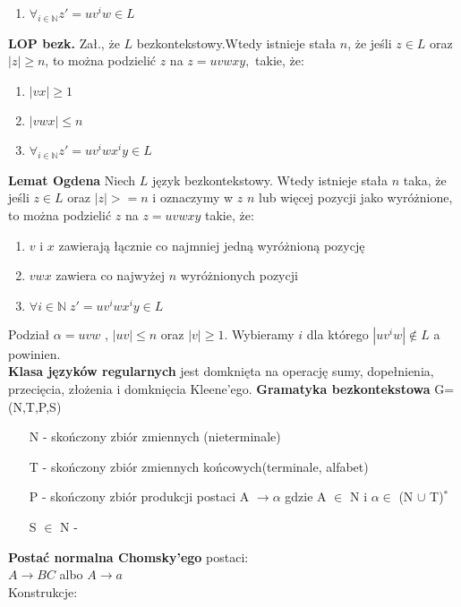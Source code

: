 \begin{multicols}{3}
\begin{enumerate}
      \item $\forall_{i \in \mathbb{N}} z'=uv^{i}w \in L$
    \end{enumerate}
    \textbf{LOP bezk.} Zał., że $L$ bezkontekstowy.Wtedy istnieje stała $n$, że jeśli $z \in L$ oraz $|z| \geqslant n$, to można podzielić $z$ na $z=uvwxy,$ takie, że:
    \begin{enumerate}
      \item $|vx| \geqslant 1$
      \item $|vwx| \leqslant n$
      \item $\forall_{i \in \mathbb{N}} z'=uv^{i}wx^{i}y \in L$
    \end{enumerate}
    \textbf{Lemat Ogdena} Niech $L$ język bezkontekstowy. Wtedy istnieje stała $n$ taka, że jeśli $z \in L$ oraz $|z| >= n$ i oznaczymy w $z$ $n$ lub więcej pozycji jako wyróżnione, to można podzielić $z$ na $z = uvwxy$ takie, że:
    \begin{enumerate}
      \item $v$ i $x$ zawierają łącznie co najmniej jedną wyróżnioną pozycję
      \item $vwx$ zawiera co najwyżej $n$ wyróżnionych pozycji
      \item $\forall i \in \mathbb{N} \; z' = uv^{i}wx^{i}y \in L$
    \end{enumerate} 
    Podział $\alpha = uvw$ , $|uv| \leqslant n$ oraz $|v| \geqslant 1$.
    Wybieramy $i$ dla którego $|uv^{i}w| \notin L$ a powinien. \\
    \textbf{Klasa języków regularnych} jest domknięta na operację sumy, 
    dopełnienia, przecięcia, złożenia i domknięcia Kleene'ego.
    \textbf{Gramatyka bezkontekstowa} G=(N,T,P,S)
    \begin{enumerate}
      \item[N] - skończony zbiór zmiennych (nieterminale)
      \item[T] - skończony zbiór zmiennych końcowych(terminale, alfabet)
      \item[P] - skończony zbiór produkcji postaci A $\rightarrow \alpha$ gdzie A $\in$ N i $\alpha \in$ (N $\cup$ T)$^{*}$
      \item[S] $\in$ N - 
    \end{enumerate} 
    \textbf{Postać normalna Chomsky'ego} postaci:\\
    $A \rightarrow BC$ albo $A \rightarrow a$\\
    Konstrukcje:\\
    \begin{enumerate}

\end{enumerate}
\end{multicols}
